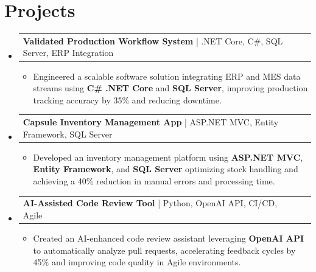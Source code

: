 \documentclass[letterpaper,10pt]{article}
\makeatletter
\newcommand{\resumeItem}[1]{
  \item{\fontsize{8pt}{9pt}\selectfont
    #1 \vspace{-3pt}
  }
}
\newcommand{\resumeProjectHeading}[2]{
    \item
    \begin{tabular*}{1.001\textwidth}{l@{\extracolsep{\fill}}r}
      \fontsize{8.5pt}{10pt}#1 & \textbf{\fontsize{8.5pt}{10pt} #2}\\
    \end{tabular*}\vspace{-7pt}
}
\newcommand{\resumeSubHeadingListStart}{\begin{itemize}[leftmargin=0pt, label={}]}
\newcommand{\resumeSubHeadingListEnd}{\end{itemize}}
\newcommand{\resumeItemListStart}{\begin{itemize}[leftmargin=*]}
\newcommand{\resumeItemListEnd}{\end{itemize}\vspace{-5pt}}
\makeatother
\begin{document}
\section{Projects}
    \vspace{-5pt}
    \resumeSubHeadingListStart
          \resumeProjectHeading
            {\textbf{Validated Production Workflow System} | .NET Core, C\#, SQL Server, ERP Integration}
            {}
            \resumeItemListStart
                \resumeItem{Engineered a scalable software solution integrating ERP and MES data streams using \textbf{C\# .NET Core} and \textbf{SQL Server}, improving production tracking accuracy by 35\% and reducing downtime.}
            \resumeItemListEnd
        \vspace{-12pt}

        \resumeProjectHeading
            {\textbf{Capsule Inventory Management App} | ASP.NET MVC, Entity Framework, SQL Server}
            {}
            \resumeItemListStart
                \resumeItem{Developed an inventory management platform using \textbf{ASP.NET MVC}, \textbf{Entity Framework}, and \textbf{SQL Server} optimizing stock handling and achieving a 40\% reduction in manual errors and processing time.}
        \resumeItemListEnd
      \vspace{-12pt}

      \resumeProjectHeading
        {\textbf{AI-Assisted Code Review Tool} | Python, OpenAI API, CI/CD, Agile}
        {}
        \resumeItemListStart
            \resumeItem{Created an AI-enhanced code review assistant leveraging \textbf{OpenAI API} to automatically analyze pull requests, accelerating feedback cycles by 45\% and improving code quality in Agile environments.}
        \resumeItemListEnd
    \resumeSubHeadingListEnd
\end{document}
